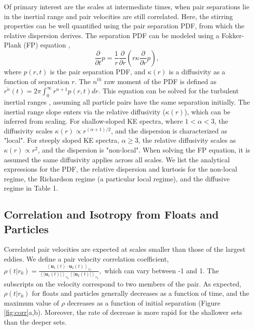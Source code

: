 \documentclass[]{ametsoc}
\begin{document}
Of primary interest are the scales at intermediate times, when pair separations lie in the inertial range and pair velocities are still correlated. Here, the stirring properties can be well quantified using the pair separation PDF, from which the relative dispersion derives. The separation PDF can be modeled using a Fokker-Plank (FP) equation \citep{richardson1926atmospheric,bennett2006lagrangian}, 
\begin{equation}
    \frac{\partial}{\partial t} p = \frac{1}{r} \frac{\partial}{\partial r} \left(r \kappa  \frac{\partial}{\partial r} p\right),
\label{eqn:PDF}
\end{equation}
where $p(r,t)$ is the pair separation PDF, and $\kappa (r)$ is a diffusivity as a function of separation $r$. The $n^{th}$ raw moment of the PDF is defined as $\overline{r^n} (t) = 2 \pi \int_0^\infty r^{n+1} p (r,t) dr$. This equation can be solved for the turbulent inertial ranges \citep{lacasce2010relative, graff2015relative}, assuming all particle pairs have the same separation initially. 
The inertial range slope enters via the relative diffusivity ($\kappa(r)$), which can be inferred from scaling.
For shallow-sloped KE spectra, where $1 <\alpha <3$, the diffusivity scales $\kappa (r)  \propto r^{(\alpha + 1)/2}$, and the dispersion is characterized as "local". For 
steeply sloped KE spectra, $\alpha \geq 3$, the relative diffusivity scales as $\kappa(r) \propto r^{2}$, and the dispersion is "non-local". When solving the FP equation, it is assumed the same diffusivity applies across all scales. 
We list the analytical expressions for the PDF, the relative dispersion and kurtosis for the non-local regime, the Richardson regime (a particular local regime), and the diffusive regime in Table 1. 

\subsection{Correlation and Isotropy from Floats and Particles}
Correlated pair velocities are expected at scales smaller than those of the largest eddies. We define a pair velocity correlation coefficient, 
$
    \rho (t|r_0) = \frac{\left< \mathbf{u}_1(t) \cdot \mathbf{u}_2(t)\right>_{r_0}}{\left<|\mathbf{u}_1(t)|\right>_{r_0}\left<|\mathbf{u}_2(t)|\right>_{r_0}},
$
which can vary between -1 and 1. The subscripts on the velocity correspond to two members of the pair. As expected, $\rho (t| r_0)$ for floats and particles generally decreases as a function of time, and the maximum value of $\rho$ decreases as a function of initial separation (Figure \ref{fig:corr}a,b). Moreover, the rate of decrease is more rapid for the shallower sets than the deeper sets.
\end{document}
